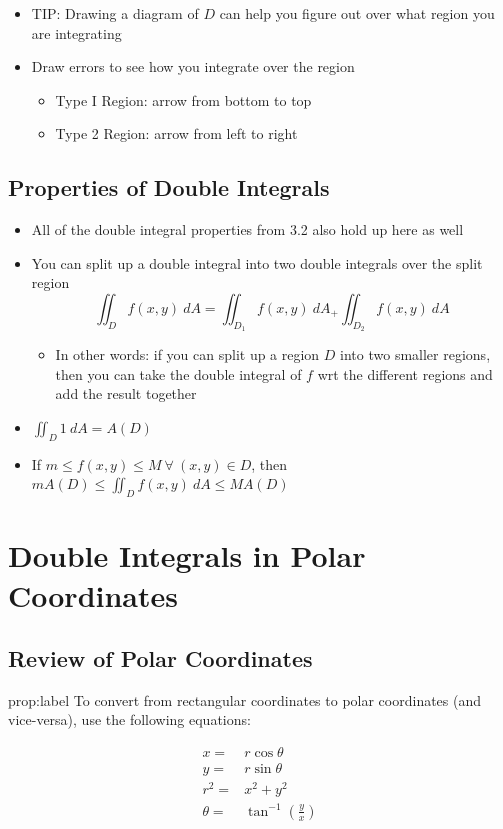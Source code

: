 \documentclass{package/notes}
\begin{document}
\begin{itemize}
	\item TIP: Drawing a diagram of $D$ can help you figure out over what region you are integrating
	\item Draw errors to see how you integrate over the region
	\begin{itemize}
		\item Type I Region: arrow from bottom to top
		\item Type 2 Region: arrow from left to right
	\end{itemize}
\end{itemize}


\subsection{Properties of Double Integrals}

\begin{itemize}
	\item All of the double integral properties from 3.2 also hold up here as well
	\item You can split up a double integral into two double integrals over the split region
	$$\iint_Df(x,y)\:dA=\iint_{D_1}f(x,y)\:dA_+\iint_{D_2}f(x,y)\:dA$$
	\begin{itemize}
		\item In other words: if you can split up a region $D$ into two smaller regions, then you can take the double integral of $f$ wrt the different regions and add the result together
	\end{itemize}
	\item $\iint_D 1\:dA=A(D)$
	\item If $m\le f(x,y)\le M\: \forall \:(x,y) \in D$, then $mA(D) \le \iint_Df(x,y)\:dA\le MA(D)$
\end{itemize}



\section{Double Integrals in Polar Coordinates}


\subsection{Review of Polar Coordinates}

\begin{proposition}{prop:label}
	To convert from rectangular coordinates to polar coordinates (and vice-versa), use the following equations:

	$$
	\begin{aligned}
		x =& r\cos\theta\\
		y=&r\sin\theta\\
		r^2=&x^2+y^2\\
		\theta =& \tan^{-1}\left(\frac{y}{x}\right)	
	\end{aligned}
	$$
\end{proposition}
\end{document}
